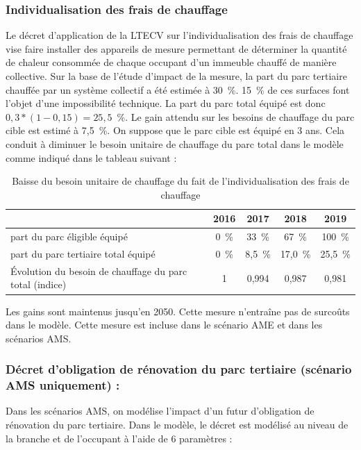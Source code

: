 \documentclass[10.5pt,a4paper]{article}
\begin{document}
{\subsubsection{Individualisation des frais de chauffage}

Le décret d'application de la LTECV sur l’individualisation  des  frais  de  chauffage  vise faire installer des appareils de mesure permettant de déterminer la quantité de chaleur consommée de chaque occupant d'un immeuble chauffé de manière collective.  Sur la base de l’étude d’impact de la mesure, la part du parc tertiaire chauffée par un système collectif a été estimée à 30~\%. 15~\% de ces surfaces font l’objet d’une impossibilité technique. La part du parc total équipé est donc $0,3*(1-0,15) = 25,5$~\%. Le gain attendu sur les besoins de chauffage du parc cible est estimé à 7,5~\%. On suppose que le parc cible est équipé en 3 ans. Cela conduit à diminuer le besoin unitaire de chauffage du parc total dans le modèle comme indiqué dans le tableau suivant  :
	
\begin{table}[h!] \caption{Baisse du besoin unitaire de chauffage du fait de l’individualisation  des  frais  de  chauffage}
\begin{tabular}[c]{|l|c|c|c|c|}
\hline
																									& 2016 & 	2017 	&	2018 	&	2019	\\
\hline																									
part du parc éligible équipé											& 0~\% & 33~\%	& 67~\% &	100~\% \\
part du parc tertiaire total équipé 							&	0~\% & 8,5~\%	&17,0~\%&	25,5~\% \\
Évolution du besoin de chauffage du parc total (indice) 		& 1	& 0,994	&	0,987	& 0,981 \\
\hline
\end{tabular}
\end{table}

Les gains sont maintenus jusqu’en 2050. Cette mesure n’entraîne pas de surcoûts dans le modèle. Cette mesure est incluse dans le scénario AME et dans les scénarios AMS. 

\subsubsection{Décret d'obligation de rénovation du parc tertiaire (scénario AMS uniquement) :}

Dans les scénarios AMS, on modélise l'impact d'un futur d'obligation de rénovation du parc tertiaire. Dans le modèle, le décret est modélisé au niveau de la branche et de l’occupant à l'aide de 6 paramètres :

}
\end{document}
